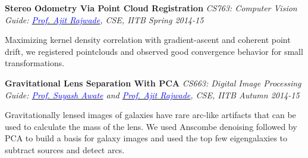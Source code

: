 \documentclass[margin,line]{res}
\newenvironment{list1}{
  \begin{list}{\ding{113}}{%
      \setlength{\itemsep}{0in}
      \setlength{\parsep}{0in} \setlength{\parskip}{0in}
      \setlength{\topsep}{0in} \setlength{\partopsep}{0in} 
      \setlength{\leftmargin}{0.17in}}}{\end{list}}
\begin{document}
\begin{resume}
\vspace*{-0.13in}

{\bf Stereo Odometry Via Point Cloud Registration} \hfill \textit{CS763: Computer Vision} \\
{\em Guide: \href{https://www.cse.iitb.ac.in/~ajitvr}{\textcolor{blue}{Prof. Ajit Rajwade}}, CSE, IITB \hfill Spring 2014-15} \\
\vspace*{-.15in}
\begin{list1}
\item[] Maximizing kernel density correlation with gradient-ascent and coherent point drift, we registered pointclouds and observed good convergence behavior for small transformations.
\end{list1}

\vspace*{-0.13in}

{\bf Gravitational Lens Separation With PCA} \hfill \textit{CS663: Digital Image Processing} \\
{\em Guide: \href{https://www.cse.iitb.ac.in/~suyash}{\textcolor{blue}{Prof. Suyash Awate}} and \href{https://www.cse.iitb.ac.in/~ajitvr}{\textcolor{blue}{Prof. Ajit Rajwade}}, CSE, IITB \hfill Autumn 2014-15} \\
\vspace*{-.15in}
\begin{list1}
\item[] Gravitationally lensed images of galaxies have rare arc-like artifacts that can be used to calculate the mass of the lens. We used Anscombe denoising followed by PCA to build a basis for galaxy images and used the top few eigengalaxies to subtract sources and detect arcs.
\end{list1}

\vspace*{-0.13in}

%


\end{resume}
\end{document}

